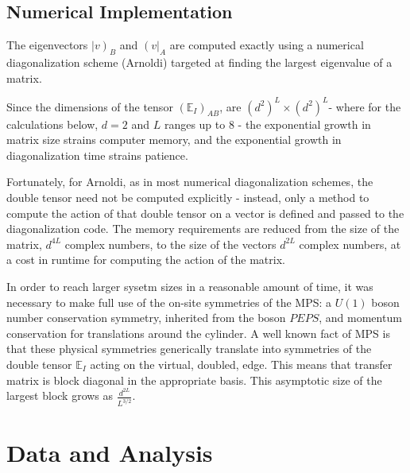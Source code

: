 \documentclass{article}
\newcommand{\vbra}[1]{\left ( #1 \right |}
\newcommand{\vket}[1]{\left |#1 \right )}
\begin{document}
\subsection{Numerical Implementation}

The eigenvectors $\vket{v}_B$ and $\vbra{v}_A$ are computed exactly using a numerical diagonalization scheme (Arnoldi) targeted at finding the largest eigenvalue of a matrix. 

Since the dimensions of the tensor $(\mathbb{E}_{I})_{AB}$,  are $(d^2)^L \times (d^2)^L $- where for the calculations below, $d = 2$ and $L$ ranges up to $8$ -  the exponential growth in matrix size strains computer memory, and the exponential growth in diagonalization time strains patience. 

Fortunately, for Arnoldi, as in most numerical diagonalization schemes, the double tensor need not be computed explicitly - instead, only a method to compute the action of that double tensor on a vector is defined and passed to the diagonalization code. The memory requirements are reduced from the size of the matrix, $d^{4L}$ complex numbers, to the size of the vectors $d^{2L}$ complex numbers, at a cost in runtime for computing the action of the matrix.

In order to reach larger sysetm sizes in a reasonable amount of time, it was necessary to make full use of the on-site symmetries of the MPS: a $U(1)$ boson number conservation symmetry, inherited from the boson $PEPS$, and momentum conservation for translations around the cylinder. A well known fact of MPS is that these physical symmetries generically translate into symmetries of the double tensor $\mathbb{E}_{I}$ acting on the virtual, doubled, edge.
This means that transfer matrix is block diagonal in the appropriate basis. This asymptotic size of the largest block grows as $\frac{d^{2L}}{L^{3/2}}$.

\newpage
\section{Data and Analysis}
\end{document}
